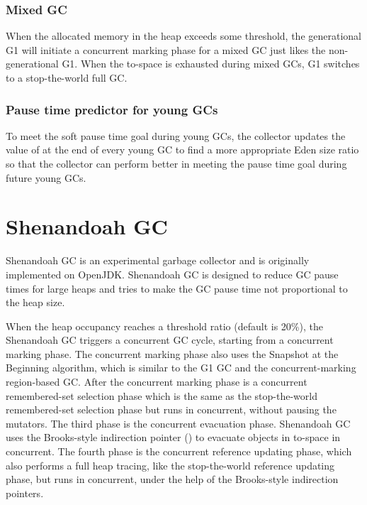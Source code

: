 \subsubsection{Mixed GC}

When the allocated memory in the heap exceeds some threshold, the generational G1 will
initiate a concurrent marking phase for a mixed GC just likes the non-generational G1.
When the to-space is exhausted during mixed GCs, G1 switches to a stop-the-world full GC.

\subsubsection{Pause time predictor for young GCs}

To meet the soft pause time goal during young GCs, the collector updates the value of 
at the end of every young GC to find a more appropriate Eden size ratio so that
the collector can perform better in meeting the pause time goal during future young GCs.
 
\section{Shenandoah GC}
\label{sec:shenandoahgc}

Shenandoah GC is an experimental garbage collector and is originally implemented on OpenJDK.
Shenandoah GC is designed to reduce GC pause times for large heaps and tries to make the GC pause
time not proportional to the heap size.
 
When the heap occupancy reaches a threshold ratio (default is 20\%), the Shenandoah GC triggers
a concurrent GC cycle, starting from a concurrent marking phase.
The concurrent marking phase also uses the Snapshot at the Beginning algorithm,
which is similar to the G1 GC and the concurrent-marking region-based GC.
After the concurrent marking phase is a concurrent remembered-set selection phase
which is the same as the stop-the-world remembered-set selection phase
but runs in concurrent, without pausing the mutators.
The third phase is the concurrent evacuation phase. Shenandoah GC uses the Brooks-style
indirection pointer (\cite{flood2016shenandoah}) to evacuate objects in to-space
in concurrent. The fourth phase is the concurrent reference updating phase, which
also performs a full heap tracing, like the stop-the-world reference updating phase,
but runs in concurrent, under the help of the Brooks-style indirection pointers.


